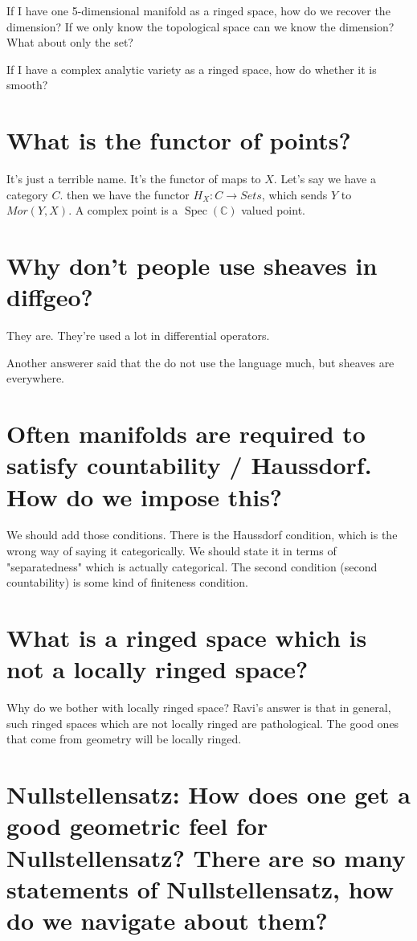 \documentclass{book}
\newcommand{\Spec}{\operatorname{Spec}}
\theoremstyle{definition}
\begin{document}
If I have one 5-dimensional manifold as a ringed space, how do we recover the
dimension? If we only know the topological space can we know the dimension?
What about only the set?

If I have a complex analytic variety as a ringed space, how do whether it is
smooth?

\section{What is the functor of points?}

It's just a terrible name. It's the functor of maps to $X$. Let's say we have
a category $C$. then we have the functor $H_X: C \rightarrow Sets$, which
sends $Y$ to $Mor(Y, X)$. A complex point is a $\Spec(\mathbb C)$ valued point.

\section{Why don't people use sheaves in diffgeo?}
They are. They're used a lot in differential operators.

Another answerer said that the do not use the language much, but sheaves are
everywhere.

\section{Often manifolds are required to satisfy countability / Haussdorf. How do we impose this?}
We should add those conditions. There is the Haussdorf condition, which is the wrong
way of saying it categorically. We should state it in terms of "separatedness" which
is actually categorical. The second condition (second countability) is some kind
of finiteness condition.

\section{What is a ringed space which is not a locally ringed space?}
Why do we bother with locally ringed space? Ravi's answer is that in general,
such ringed spaces which are not locally ringed are pathological. The good ones
that come from geometry will be locally ringed.

\section{Nullstellensatz: How does one get a good geometric feel for Nullstellensatz? There are so many statements of Nullstellensatz,
how do we navigate about them?}
\end{document}
